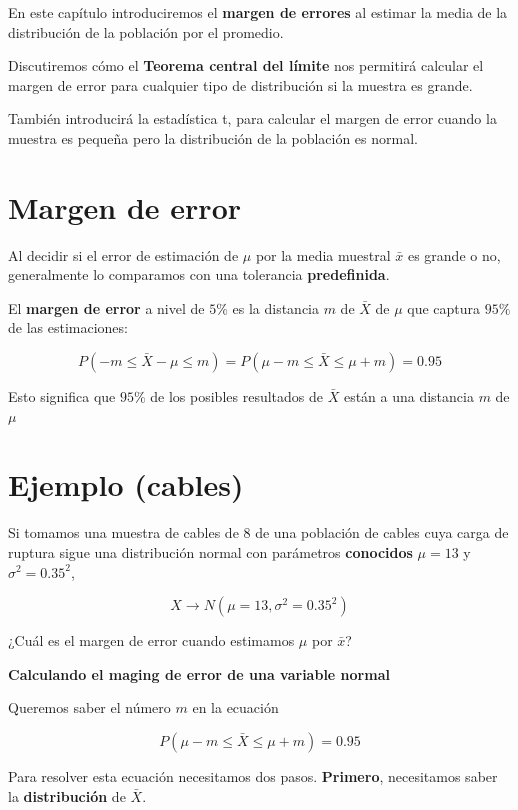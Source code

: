 \documentclass[
]{book}
\begin{document}
En este capítulo introduciremos el \textbf{margen de errores} al estimar la media de la distribución de la población por el promedio.

Discutiremos cómo el \textbf{Teorema central del límite } nos permitirá calcular el margen de error para cualquier tipo de distribución si la muestra es grande.

También introducirá la estadística t, para calcular el margen de error cuando la muestra es pequeña pero la distribución de la población es normal.

\hypertarget{margen-de-error}{%
\section{Margen de error}\label{margen-de-error}}

Al decidir si el error de estimación de \(\mu\) por la media muestral \(\bar{x}\) es grande o no, generalmente lo comparamos con una tolerancia \textbf{predefinida}.

El \textbf{margen de error} a nivel de \(5\%\) es la distancia \(m\) de \(\bar{X}\) de \(\mu\) que captura \(95\%\) de las estimaciones:

\[P(-m \leq \bar{X}-\mu \leq m)=P(\mu-m \leq \bar{X} \leq\mu + m)=0.95\]

Esto significa que \(95\%\) de los posibles resultados de \(\bar{X}\) están a una distancia \(m\) de \(\mu\)

\hypertarget{ejemplo-cables}{%
\section{Ejemplo (cables)}\label{ejemplo-cables}}

Si tomamos una muestra de cables de \(8\) de una población de cables cuya carga de ruptura sigue una distribución normal con parámetros \textbf{conocidos} \(\mu=13\) y \(\sigma^2=0.35^2\),

\[X \rightarrow N(\mu=13, \sigma^2=0.35^2)\]

¿Cuál es el margen de error cuando estimamos \(\mu\) por \(\bar{x}\)?

\textbf{Calculando el maging de error de una variable normal}

Queremos saber el número \(m\) en la ecuación

\[P(\mu-m \leq \bar{X} \leq\mu + m)=0.95\]

Para resolver esta ecuación necesitamos dos pasos. \textbf{Primero}, necesitamos saber la \textbf{distribución} de \(\bar{X}\).
\end{document}
